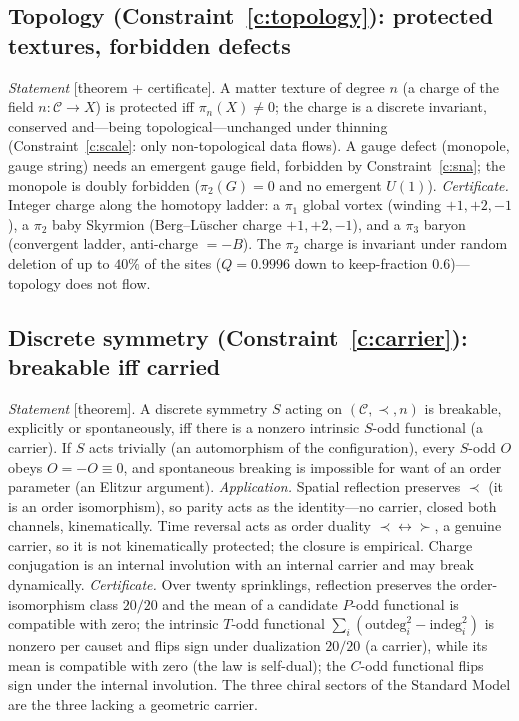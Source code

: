 \documentclass[aps,prd,reprint,nofootinbib,superscriptaddress,floatfix]{revtex4-2}
\begin{document}
\subsection{Topology (Constraint~\ref{c:topology}): protected textures, forbidden defects}
\label{app:topology}

\emph{Statement} [theorem + certificate]. A matter texture of degree $n$ (a charge of the field
$n\colon\mathcal C\to X$) is protected iff $\pi_n(X)\neq0$; the charge is a discrete invariant,
conserved and---being topological---unchanged under thinning (Constraint~\ref{c:scale}: only
non-topological data flows). A gauge defect (monopole, gauge string) needs an emergent gauge
field, forbidden by Constraint~\ref{c:sna}; the monopole is doubly forbidden ($\pi_2(G)=0$ and no
emergent $U(1)$). \emph{Certificate.} Integer charge along the homotopy ladder: a $\pi_1$ global
vortex (winding $+1,+2,-1$), a $\pi_2$ baby Skyrmion (Berg--L\"uscher charge $+1,+2,-1$), and a
$\pi_3$ baryon (convergent ladder, anti-charge $=-B$). The $\pi_2$ charge is invariant under
random deletion of up to $40\%$ of the sites ($Q=0.9996$ down to keep-fraction $0.6$)---topology
does not flow.

\subsection{Discrete symmetry (Constraint~\ref{c:carrier}): breakable iff carried}
\label{app:carrier}

\emph{Statement} [theorem]. A discrete symmetry $S$ acting on $(\mathcal C,\prec,n)$ is breakable,
explicitly or spontaneously, iff there is a nonzero intrinsic $S$-odd functional (a carrier). If
$S$ acts trivially (an automorphism of the configuration), every $S$-odd $O$ obeys $O=-O\equiv0$,
and spontaneous breaking is impossible for want of an order parameter (an Elitzur argument).
\emph{Application.} Spatial reflection preserves $\prec$ (it is an order isomorphism), so parity
acts as the identity---no carrier, closed both channels, kinematically. Time reversal acts as
order duality $\prec\leftrightarrow\succ$, a genuine carrier, so it is not kinematically
protected; the closure is empirical. Charge conjugation is an internal involution with an internal
carrier and may break dynamically. \emph{Certificate.} Over twenty sprinklings, reflection
preserves the order-isomorphism class $20/20$ and the mean of a candidate $P$-odd functional is
compatible with zero; the intrinsic $T$-odd functional $\sum_i(\mathrm{outdeg}_i^2-
\mathrm{indeg}_i^2)$ is nonzero per causet and flips sign under dualization $20/20$ (a carrier),
while its mean is compatible with zero (the law is self-dual); the $C$-odd functional flips sign
under the internal involution. The three chiral sectors of the Standard Model are the three
lacking a geometric carrier.
\end{document}
